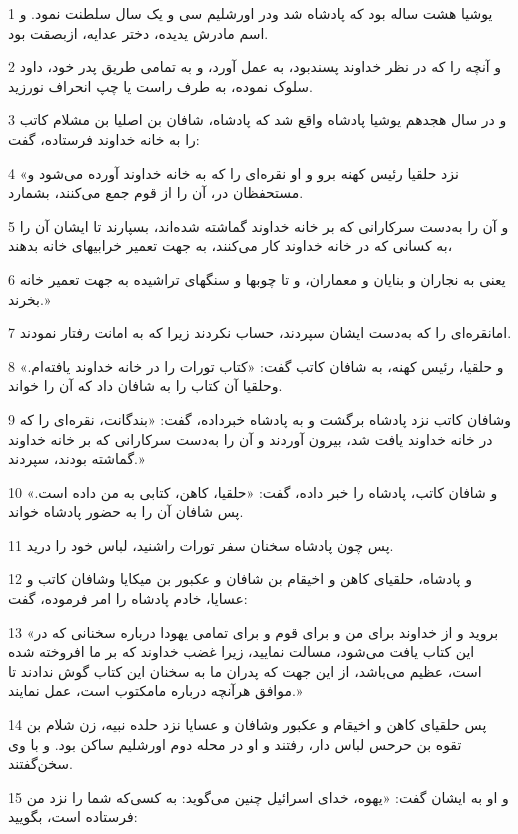 \par 1 یوشیا هشت ساله بود که پادشاه شد ودر اورشلیم سی و یک سال سلطنت نمود. و اسم مادرش یدیده، دختر عدایه، ازبصقت بود.
\par 2 و آنچه را که در نظر خداوند پسندبود، به عمل آورد، و به تمامی طریق پدر خود، داود سلوک نموده، به طرف راست یا چپ انحراف نورزید.
\par 3 و در سال هجدهم یوشیا پادشاه واقع شد که پادشاه، شافان بن اصلیا بن مشلام کاتب را به خانه خداوند فرستاده، گفت:
\par 4 «نزد حلقیا رئیس کهنه برو و او نقره‌ای را که به خانه خداوند آورده می‌شود و مستحفظان در، آن را از قوم جمع می‌کنند، بشمارد.
\par 5 و آن را به‌دست سرکارانی که بر خانه خداوند گماشته شده‌اند، بسپارند تا ایشان آن را به کسانی که در خانه خداوند کار می‌کنند، به جهت تعمیر خرابیهای خانه بدهند،
\par 6 یعنی به نجاران و بنایان و معماران، و تا چوبها و سنگهای تراشیده به جهت تعمیر خانه بخرند.»
\par 7 امانقره‌ای را که به‌دست ایشان سپردند، حساب نکردند زیرا که به امانت رفتار نمودند.
\par 8 و حلقیا، رئیس کهنه، به شافان کاتب گفت: «کتاب تورات را در خانه خداوند یافته‌ام.» وحلقیا آن کتاب را به شافان داد که آن را خواند.
\par 9 وشافان کاتب نزد پادشاه برگشت و به پادشاه خبرداده، گفت: «بندگانت، نقره‌ای را که در خانه خداوند یافت شد، بیرون آوردند و آن را به‌دست سرکارانی که بر خانه خداوند گماشته بودند، سپردند.»
\par 10 و شافان کاتب، پادشاه را خبر داده، گفت: «حلقیا، کاهن، کتابی به من داده است.» پس شافان آن را به حضور پادشاه خواند.
\par 11 پس چون پادشاه سخنان سفر تورات راشنید، لباس خود را درید.
\par 12 و پادشاه، حلقیای کاهن و اخیقام بن شافان و عکبور بن میکایا وشافان کاتب و عسایا، خادم پادشاه را امر فرموده، گفت:
\par 13 «بروید و از خداوند برای من و برای قوم و برای تمامی یهودا درباره سخنانی که در این کتاب یافت می‌شود، مسالت نمایید، زیرا غضب خداوند که بر ما افروخته شده است، عظیم می‌باشد، از این جهت که پدران ما به سخنان این کتاب گوش ندادند تا موافق هرآنچه درباره مامکتوب است، عمل نمایند.»
\par 14 پس حلقیای کاهن و اخیقام و عکبور وشافان و عسایا نزد حلده نبیه، زن شلام بن تقوه بن حرحس لباس دار، رفتند و او در محله دوم اورشلیم ساکن بود. و با وی سخن‌گفتند.
\par 15 و او به ایشان گفت: «یهوه، خدای اسرائیل چنین می‌گوید: به کسی‌که شما را نزد من فرستاده است، بگویید:
